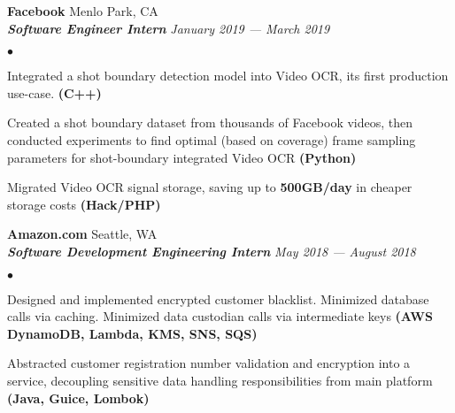 \documentclass[10pt]{article}
\newcommand{\employer}[4]{{ \normalsize\textbf{#1} \small\hfill{#2}\\ {\small\textbf{\emph{#3}}} \small\hfill\textit{#4}\\  }}
\newenvironment{achievements}{\begin{list}{$\bullet$}{\topsep 0pt \itemsep -2pt}}{\vspace*{6pt}\end{list}}
\begin{document}
\vspace{4pt}

\employer{Facebook}{Menlo Park, CA}{Software Engineer Intern}{January 2019 --- March 2019}
\begin{achievements}
	\item Integrated a shot boundary detection model into Video OCR, its first production use-case. \textbf{(C++)}
	\item Created a shot boundary dataset from thousands of Facebook videos, then conducted experiments to find optimal (based on coverage) frame sampling parameters for shot-boundary integrated Video OCR \textbf{(Python)}
	\item Migrated Video OCR signal storage, saving up to \textbf{500GB/day} in cheaper storage costs \textbf{(Hack/PHP)}
\end{achievements}

\vspace{4pt}

\employer{Amazon.com}{Seattle, WA}{Software Development Engineering Intern}{May 2018 --- August 2018}
\begin{achievements}
	\item Designed and implemented encrypted customer blacklist. Minimized database calls via caching. Minimized data custodian calls via intermediate keys \textbf{(AWS DynamoDB, Lambda, KMS, SNS, SQS)}
	\item Abstracted customer registration number validation and encryption into a service, decoupling sensitive data handling responsibilities from main platform \textbf{(Java, Guice, Lombok)}
\end{achievements}



\end{document}
